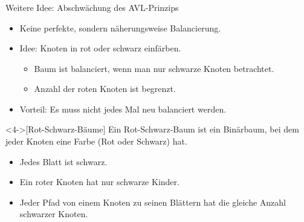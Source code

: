\begin{frame}
\frametitle{\insertsection}
\begin{block}
{Weitere Idee: Abschwächung des AVL-Prinzips}
\begin{itemize}
	\item Keine perfekte, sondern näherungsweise Balancierung.
	\item<2-> Idee: Knoten in rot oder schwarz einfärben.
	\begin{itemize}
		\item Baum ist balanciert, wenn man nur schwarze Knoten betrachtet.
		\item Anzahl der roten Knoten ist begrenzt.
	\end{itemize}
	\item<3-> Vorteil: Es muss nicht jedes Mal neu balanciert werden.
\end{itemize}
\end{block}
\begin{definition}<4->[Rot-Schwarz-Bäume]
Ein \alert{Rot-Schwarz-Baum} ist ein Binärbaum, bei dem jeder Knoten eine Farbe (Rot oder Schwarz) hat.
\begin{itemize}
	\item Jedes Blatt ist schwarz.
	\item Ein roter Knoten hat nur schwarze Kinder.
	\item Jeder Pfad von einem Knoten zu seinen Blättern hat die gleiche Anzahl schwarzer Knoten.
\end{itemize}
\end{definition}
\end{frame}